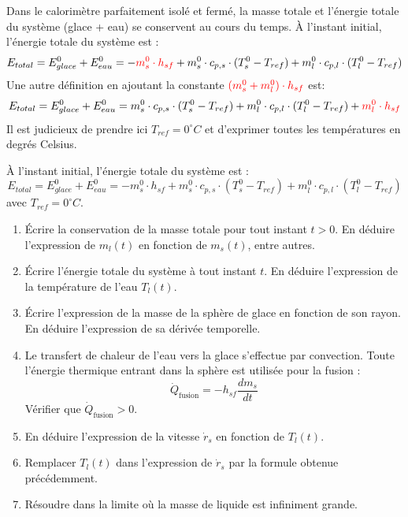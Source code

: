 \documentclass[a4paper, 12pt]{article}
\begin{document}
Dans le {\color{red} calorimètre parfaitement isolé et fermé}, la masse totale et l'énergie totale du système (glace + eau) se conservent au cours du temps. À l'instant initial, l'énergie totale du système est :
\begin{equation*}
E_{total} = E_{glace}^0 + E_{eau}^0 = 
-{\color{red} m_{s}^0 \cdot h_{sf}} + m_{s}^0 \cdot c_{p,s} \cdot (T_s^0-T_{ref}) + m_{l}^0 \cdot c_{p,l} \cdot (T_{l}^0-T_{ref})
\end{equation*}
Une autre définition en ajoutant la constante ${\color{red} (m_s^0+m_l^0) \cdot h_{sf}}$ est:
\vspace{-0.2cm}
\begin{equation*}
E_{total} = E_{glace}^0 + E_{eau}^0 = 
 m_{s}^0 \cdot c_{p,s} \cdot (T_s^0-T_{ref}) + m_{l}^0 \cdot c_{p,l} \cdot (T_{l}^0-T_{ref})
+{\color{red} m_{l}^0 \cdot h_{sf}}
\end{equation*}
Il est judicieux de prendre ici $T_{ref}=0^\circ C$ et d'exprimer toutes les températures en degrés Celsius.


À l'instant initial, l'énergie totale du système est :
\begin{equation*}
E_{total} = E_{glace}^0 + E_{eau}^0 = 
 -m_{s}^0 \cdot h_{sf} + m_{s}^0 \cdot c_{p,s} \cdot (T_s^0-T_{ref}) + m_{l}^0 \cdot c_{p,l} \cdot (T_{l}^0-T_{ref})
\end{equation*}
avec $T_{ref} = 0^\circ C$.

\begin{enumerate}[itemsep=2pt, topsep=2pt, parsep=0pt, partopsep=2pt]
\item Écrire la conservation de la masse totale pour tout instant $t>0$. En déduire l'expression de $m_{l}(t)$ en fonction de $m_s(t)$, entre autres.
\item Écrire l'énergie totale du système à tout instant $t$. En déduire l'expression de la température de l'eau $T_l(t)$.
\item Écrire l'expression de la masse de la sphère de glace en fonction de son rayon. En déduire l'expression de sa dérivée temporelle.
\item Le transfert de chaleur de l'eau vers la glace s'effectue par convection.  
Toute l'énergie thermique entrant dans la sphère est utilisée pour la fusion :
\[
\dot{Q}_{\text{fusion}} = -h_{sf} \frac{dm_s}{dt}
\]
Vérifier que $\dot{Q}_{\text{fusion}}>0$.
\item En déduire l'expression de la vitesse $\dot{r}_s$ en fonction de $T_l(t)$.
\item Remplacer $T_l(t)$ dans l'expression de $\dot{r}_s$ par la formule obtenue précédemment.
\item Résoudre dans la limite où la masse de liquide est infiniment grande.
\end{enumerate}
\end{document}
